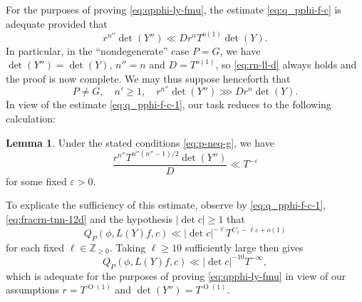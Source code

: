 \documentclass[reqno]{amsart}
\def\eps{\varepsilon}
\def\O{\operatorname{O}}
\theoremstyle{plain} \newtheorem{theorem} {Theorem}
\theoremstyle{definition} \newtheorem{definition} [theorem] {Definition}
\theoremstyle{itplain} %
\newtheorem{lemma}[theorem]{Lemma}
\numberwithin{equation}{section}
\numberwithin{theorem}{section}
\renewcommand{\geq}{\geqslant}
\begin{document}
For the purposes of proving \eqref{eq:qpphi-ly-fmu}, the estimate \eqref{eq:q_pphi-f-c} is adequate provided that
\begin{equation}\label{eq:rn-ll-d}
  r^{n''}\det(Y'') \ll D r^n T^{o(1)} \det(Y).
\end{equation}
In particular, in the ``nondegenerate'' case $P = G$, we have $\det(Y'') = \det(Y)$, $n'' = n$ and $D = T^{o(1)}$, so \eqref{eq:rn-ll-d} always holds and the proof is now complete.  We may thus suppose henceforth that
\begin{equation}\label{eq:p-neq-g}
  P \neq G, 
  \quad
  n' \geq 1,
  \quad
  r^{n''} \det(Y'') \ggg D r^n \det(Y).
\end{equation}
In view of the estimate \eqref{eq:q_pphi-f-c-1}, our task reduces to the following calculation:
\begin{lemma}\label{lem:under-stat-cond}
  Under the stated conditions \eqref{eq:p-neq-g}, we have
  \begin{equation}\label{eq:fracrn-tnn-12d}
    \frac{r^{n''} T^{n''(n''-1)/2} \det (Y'')}{D}
    \ll T^{-\eps}
  \end{equation}
  for some fixed $\eps > 0$.
\end{lemma}
To explicate the sufficiency of this estimate, observe by \eqref{eq:q_pphi-f-c-1}, \eqref{eq:fracrn-tnn-12d} and the hypothesis $|\det c| \geq 1$ that
  \begin{equation*}
    Q_P(\phi, L(Y) f,c) \ll |\det c|^{-\ell} T^{C_1 - \ell \eps + o(1)}
  \end{equation*}
  for each fixed $\ell \in \mathbb{Z}_{\geq 0}$.  Taking $\ell \geq 10$ sufficiently large then gives
  \begin{equation*}
Q_P(\phi,L(Y) f,c) \ll |\det c|^{-10} T^{-\infty},
\end{equation*}
 which is adequate for the purposes of proving \eqref{eq:qpphi-ly-fmu} in view of our assumptions $r = T^{\O(1)}$ and $\det(Y'') = T^{\O(1)}$.
\end{document}
